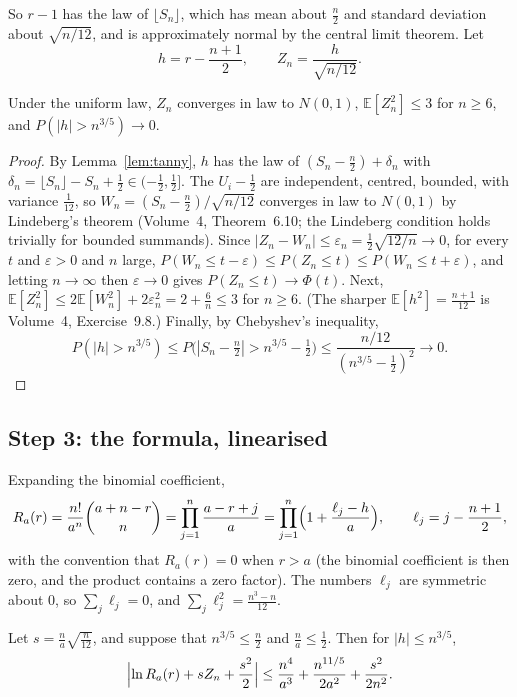 So $r-1$ has the law of $\lfloor S_n\rfloor$, which has mean about $\frac n2$ and standard deviation about $\sqrt{n/12}$, and is approximately normal by the central limit
theorem. Let
\[
h=r-\frac{n+1}2,\qquad Z_n=\frac h{\sqrt{n/12}}.
\]

\begin{lemma}\label{lem:risingclt}
Under the uniform law, $Z_n$ converges in law to $N(0,1)$, $\mathbb E[Z_n^2]\le3$ for $n\ge6$, and $P(|h|>n^{3/5})\to0$.
\end{lemma}

\begin{proof}
By Lemma~\ref{lem:tanny}, $h$ has the law of $(S_n-\frac n2)+\delta_n$ with $\delta_n=\lfloor S_n\rfloor-S_n+\frac12\in(-\frac12,\frac12]$. The $U_i-\frac12$ are independent, centred, bounded, with variance
$\frac1{12}$, so $W_n=(S_n-\frac n2)/\sqrt{n/12}$ converges in law to $N(0,1)$ by Lindeberg's theorem (Volume~4, Theorem~6.10; the Lindeberg condition holds trivially for
bounded summands). Since $|Z_n-W_n|\le\varepsilon_n=\frac12\sqrt{12/n}\to0$, for every $t$ and $\varepsilon>0$ and $n$ large, $P(W_n\le t-\varepsilon)\le P(Z_n\le t)\le P(W_n\le t+\varepsilon)$, and letting
$n\to\infty$ then $\varepsilon\to0$ gives $P(Z_n\le t)\to\Phi(t)$. Next, $\mathbb E[Z_n^2]\le2\mathbb E[W_n^2]+2\varepsilon_n^2=2+\frac6n\le3$ for $n\ge6$. (The sharper $\mathbb E[h^2]=\frac{n+1}{12}$ is Volume~4, Exercise~9.8.) Finally, by Chebyshev's inequality,
\[
P(|h|>n^{3/5})\le P\bigl(|S_n-\tfrac n2|>n^{3/5}-\tfrac12\bigr)\le\frac{n/12}{(n^{3/5}-\frac12)^2}\longrightarrow0.
\]
\end{proof}

\subsection*{Step 3: the formula, linearised}

Expanding the binomial coefficient,
\[
R_a(r)=\frac{n!}{a^n}\binom{a+n-r}n=\prod_{j=1}^n\frac{a-r+j}a=\prod_{j=1}^n\Bigl(1+\frac{\ell_j-h}a\Bigr),\qquad\ell_j=j-\frac{n+1}2,
\]
with the convention that $R_a(r)=0$ when $r>a$ (the binomial coefficient is then zero, and the product contains a zero factor). The numbers $\ell_j$ are symmetric about $0$, so $\sum_j\ell_j=0$, and $\sum_j\ell_j^2=\frac{n^3-n}{12}$.

\begin{lemma}\label{lem:linearise}
Let $s=\frac{n}{a}\sqrt{\frac n{12}}$, and suppose that $n^{3/5}\le\frac n2$ and $\frac na\le\frac12$. Then for $|h|\le n^{3/5}$,
\[
\Bigl|\ln R_a(r)+sZ_n+\frac{s^2}2\Bigr|\le\frac{n^4}{a^3}+\frac{n^{11/5}}{2a^2}+\frac{s^2}{2n^2}.
\]
\end{lemma}


